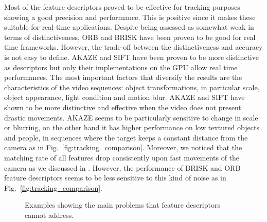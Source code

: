 Most of the feature descriptors proved to be effective for tracking purposes showing a good precision and performance. This is positive since it makes these suitable for real-time applications. Despite being assessed as somewhat weak in terms of distinctiveness, ORB and BRISK have been proven to be good for real time frameworks. 
However, the trade-off between the distinctiveness and accuracy is not easy to define.
AKAZE and SIFT have been proven to be more distinctive as descriptors but only their implementations on the GPU allow real time performances. 
The most important factors that diversify the results are the characteristics of the video sequences: object transformations, in particular scale, object appearance, light condition and motion blur. AKAZE and SIFT have shown to be more distinctive and effective when the video does not present drastic movements. AKAZE seems to be particularly sensitive to change in scale or blurring, on the other hand it has higher performance on low textured objects and people, in sequences where the target keeps a constant distance from the camera as in Fig.~\ref{fig:tracking_comparison}.
Moreover, we noticed that the matching rate of all features drop consistently upon fast movements of the camera as we discussed in \cite{pieropan15}. However, the performance of BRISK and ORB feature descriptors seems to be less sensitive to this kind of noise as in Fig.~\ref{fig:tracking_comparison}. 

\begin{figure}[!htb]
	\vspace{2mm}
\centerline{%
	}
	\vspace{-2mm}
\caption{Examples showing the main problems that feature descriptors cannot address. }
\label{fig:tracking_results_scale}
\end{figure} 


